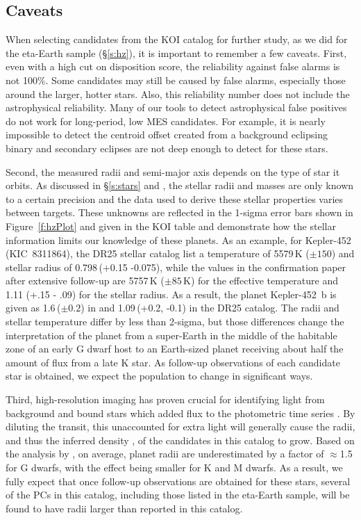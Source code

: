 \subsection{Caveats}
{\color{blue}
When selecting candidates from the KOI catalog for further study, as we did for the eta-Earth sample (\S\ref{s:hz}), it is important to remember a few caveats. First, even with a high cut on disposition score, the reliability against false alarms is not 100\%. Some candidates may still be caused by false alarms, especially those around the larger, hotter stars. Also, this reliability number does not include the astrophysical reliability. Many of our tools to detect astrophysical false positives do not work for long-period, low MES candidates. For example, it is nearly impossible to detect the centroid offset created from a background eclipsing binary and secondary eclipses are not deep enough to detect for these stars. 

Second, the measured radii and semi-major axis depends on the type of star it orbits.  As discussed in \S\ref{s:stars} and \citet{Mathur2017ApJS}, the stellar radii and masses are only known to a certain precision and the data used to derive these stellar properties varies between targets. These unknowns are reflected in the 1-sigma error bars shown in Figure~\ref{f:hzPlot} and given in the KOI table and demonstrate how the stellar information limits our knowledge of these planets.  As an example, for Kepler-452 (KIC~8311864), the DR25 stellar catalog list a temperature of 5579\,K ($\pm150$) and stellar radius of 0.798\,\rsun (+0.15 -0.075), while the values in the confirmation paper \citep{Jenkins2015} after extensive follow-up are 5757\,K ($\pm85$\,K) for the effective temperature and 1.11 (+.15 - .09) for the stellar radius.  As a result, the planet Kepler-452~b is given as 1.6\,\re ($\pm0.2$) in \citet{Jenkins2015} and 1.09\,\re (+0.2, -0.1) in the DR25 catalog. The radii and stellar temperature differ by less than 2-sigma, but those differences change the interpretation of the planet from a super-Earth in the middle of the habitable zone of an early G dwarf host to an Earth-sized planet receiving about half the amount of flux from a late K star.  As follow-up observations of each candidate star is obtained, we expect the population to change in significant ways.  

Third, high-resolution imaging has proven crucial for identifying light from background and bound stars which added flux to the \Kepler{} photometric time series \citep{Furlan2017}. By diluting the transit, this unaccounted for extra light will generally cause the radii, and thus the inferred density \citep[see][]{Furlan2017densities}, of the candidates in this catalog to grow. Based on the analysis by \citet{Ciardi2015}, on average, planet radii are underestimated by a factor of $\approx$1.5 for G dwarfs, with the effect being smaller for K and M dwarfs. As a result, we fully expect that once follow-up observations are obtained for these stars, several of the PCs in this catalog, including those listed in the eta-Earth sample, will be found to have radii larger than reported in this catalog. 

}





